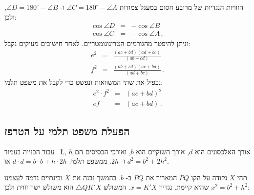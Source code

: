 הזוויות הנגדיות של מרובע חסום במעגל צמודות
$\angle C = 180^\circ - \angle A$
ו-%
$\angle D = 180^\circ - \angle B$,
ולכן:
\begin{eqnarray*}
\cos \angle D &=& - \cos \angle B\\
\cos \angle C &=& -\cos \angle A\,,
\end{eqnarray*}
וניתן להיפטר מהגורמים הטריגונומטריים. לאחר חישובים מעיקים נקבל:
\begin{eqnarray*}
e^2 &=& \frac{(ac+bd)(ad+bc)}{(ab+cd)}\\
f^2 &=& \frac{(ab+cd)(ac+bd)}{(ad+bc)}\,.
\end{eqnarray*}
נכפיל את שתי המשוואות ונפשט כדי לקבל את משפט תלמי:
\begin{eqnarray*}
e^2\cdot f^2 &=& (ac+bd)^2\\
ef &=& (ac+bd)\,. 
\end{eqnarray*}

\vspace{-8ex}

\subsection*{הפעלת משפט תלמי על הטרפז}

עבור הבנייה בעמוד~%
\L{\pageref{p.ptolemy}},
אורך האלכסונים הוא
$d$,
אורך השוקיים הוא
$b$,
ואורכי הבסיסים הם
$h$
ו-%
$2h$.
ממשפט תלמי:
$d\cdot d = b\cdot b + h\cdot 2h$
או
$d^2=b^2+2h^2$.

תהי
$X$
נקודה על הקו
$PQ$
המאריך את
$PQ$
ב-%
$b$.
בהמשך נבנה את 
$X$
ובינתיים נדמה לעצמנו שהיא קיימת. נגדיר 
$x = K'X$.
המשולש
$\triangle QK'X$
הוא משולש ישר זווית ולכן
$x^2 = b^2 + h^2$:


